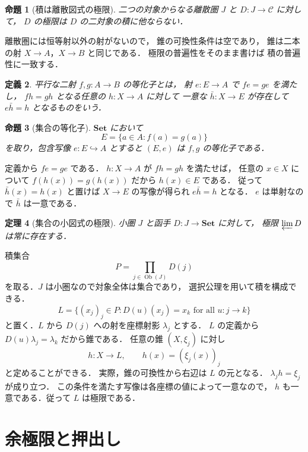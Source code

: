 \documentclass[a5paper,10pt,onecolumn]{jsarticle}
\makeatletter
\theoremstyle{mathnotetheorem}
\newtheorem{theorem}{定理}[section]
\newtheorem{definition}[theorem]{定義}
\newtheorem{proposition}[theorem]{命題}
\renewcommand{\proofname}{証明}
\renewenvironment{proof}[1][\proofname]{%
  \par\pushQED{\qed}\normalfont\topsep4\p@\@plus2\p@\relax
  \trivlist\item[\hskip\labelsep\bfseries #1]\ignorespaces
}{\popQED\endtrivlist\@endpefalse}
\makeatother
\begin{document}
\begin{proposition}[積は離散図式の極限]\label{prop:product}
二つの対象からなる離散圏 $J$ と
$D:J\to\mathcal C$ に対して，
$D$ の極限は $D$ の二対象の積に他ならない．
\end{proposition}
\begin{proof}
離散圏には恒等射以外の射がないので，
錐の可換性条件は空であり，
錐は二本の射 $X\to A$，$X\to B$ と同じである．
極限の普遍性をそのまま書けば
積の普遍性に一致する．
\end{proof}

\begin{definition}
平行な二射 $f,g:A\to B$ の\emph{等化子}とは，
射 $e:E\to A$ で $fe=ge$ を満たし，
$fh=gh$ となる任意の $h:X\to A$ に対して
一意な $\bar h:X\to E$ が存在して
$e\bar h=h$ となるものをいう．
\end{definition}

\begin{proposition}[集合の等化子]\label{prop:equalizer-set}
$\mathbf{Set}$ において
\[
 E=\{a\in A:f(a)=g(a)\}
\]
を取り，包含写像 $e:E\hookrightarrow A$ とすると
$(E,e)$ は $f,g$ の等化子である．
\end{proposition}
\begin{proof}
定義から $fe=ge$ である．
$h:X\to A$ が $fh=gh$ を満たせば，
任意の $x\in X$ について
$f(h(x))=g(h(x))$ だから $h(x)\in E$ である．
従って $\bar h(x)=h(x)$ と置けば
$X\to E$ の写像が得られ $e\bar h=h$ となる．
$e$ は単射なので $\bar h$ は一意である．
\end{proof}

\begin{theorem}[集合の小図式の極限]\label{thm:set-limits}
小圏 $J$ と函手 $D:J\to\mathbf{Set}$ に対して，
極限 $\varprojlim D$ は常に存在する．
\end{theorem}
\begin{proof}
積集合
\[
 P=\prod_{j\in\operatorname{Ob}(J)}D(j)
\]
を取る．$J$ は小圏なので対象全体は集合であり，
選択公理を用いて積を構成できる．
\[
 L=\{(x_j)_j\in P:
 D(u)(x_j)=x_k
 \text{ for all }u:j\to k\}
\]
と置く．$L$ から $D(j)$ への射を座標射影 $\lambda_j$ とする．
$L$ の定義から
$D(u)\lambda_j=\lambda_k$ だから錐である．
任意の錐 $(X,\xi_j)$ に対し
\[
 h:X\to L,\qquad h(x)=(\xi_j(x))_j
\]
と定めることができる．
実際，錐の可換性から右辺は $L$ の元となる．
$\lambda_jh=\xi_j$ が成り立つ．
この条件を満たす写像は各座標の値によって一意なので，
$h$ も一意である．従って $L$ は極限である．
\end{proof}

\section{余極限と押出し}
\end{document}

